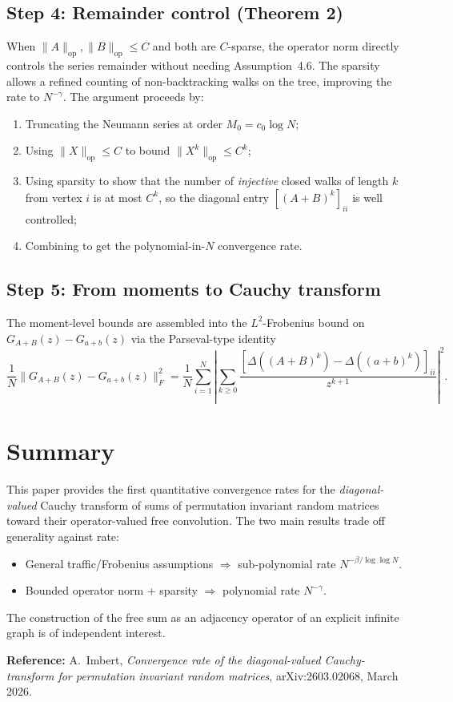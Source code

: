 \documentclass[11pt,a4paper]{article}
\begin{document}
\subsection*{Step 4: Remainder control (Theorem 2)}

When $\|A\|_{\mathrm{op}},\|B\|_{\mathrm{op}}\le C$ and both are $C$-sparse, the operator norm directly controls the series remainder without needing Assumption~4.6. The sparsity allows a refined counting of non-backtracking walks on the tree, improving the rate to $N^{-\gamma}$. The argument proceeds by:
\begin{enumerate}
\item Truncating the Neumann series at order $M_0 = c_0 \log N$;
\item Using $\|X\|_{\mathrm{op}}\le C$ to bound $\|X^k\|_{\mathrm{op}} \le C^k$;
\item Using sparsity to show that the number of \emph{injective} closed walks of length $k$ from vertex $i$ is at most $C^k$, so the diagonal entry $[(A+B)^k]_{ii}$ is well controlled;
\item Combining to get the polynomial-in-$N$ convergence rate.
\end{enumerate}

\subsection*{Step 5: From moments to Cauchy transform}

The moment-level bounds are assembled into the $L^2$-Frobenius bound on $G_{A+B}(z) - G_{a+b}(z)$ via the Parseval-type identity
\[
  \frac{1}{N}\|G_{A+B}(z) - G_{a+b}(z)\|_F^2
  = \frac{1}{N}\sum_{i=1}^N \left|\sum_{k\ge 0} \frac{[\Delta((A+B)^k) - \Delta((a+b)^k)]_{ii}}{z^{k+1}}\right|^2.
\]

\section{Summary}

This paper provides the first quantitative convergence rates for the \emph{diagonal-valued} Cauchy transform of sums of permutation invariant random matrices toward their operator-valued free convolution. The two main results trade off generality against rate:
\begin{itemize}
\item General traffic/Frobenius assumptions $\Rightarrow$ sub-polynomial rate $N^{-\beta/\log\log N}$.
\item Bounded operator norm + sparsity $\Rightarrow$ polynomial rate $N^{-\gamma}$.
\end{itemize}
The construction of the free sum as an adjacency operator of an explicit infinite graph is of independent interest.

\bigskip
\noindent\textbf{Reference:} A.~Imbert, \emph{Convergence rate of the diagonal-valued Cauchy-transform for permutation invariant random matrices}, arXiv:2603.02068, March 2026.
\end{document}
